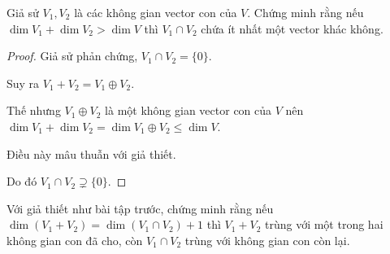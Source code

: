 \documentclass[class=linearalgebra,crop=false]{standalone}
\begin{document}
\begin{exercise}Giả sử $V_{1}, V_{2}$ là các không gian vector con của $V$. Chứng minh rằng nếu $\dim V_{1} + \dim V_{2} > \dim V$ thì $V_{1}\cap V_{2}$ chứa ít nhất một vector khác không.
\end{exercise}

\begin{proof}Giả sử phản chứng, $V_{1}\cap V_{2} = \{ 0 \}$.
    \par Suy ra $V_{1} + V_{2} = V_{1}\oplus V_{2}$.
    \par Thế nhưng $V_{1}\oplus V_{2}$ là một không gian vector con của $V$ nên $\dim V_{1} + \dim V_{2} = \dim V_{1}\oplus V_{2} \le \dim V$.
    \par Điều này mâu thuẫn với giả thiết.
    \par Do đó $V_{1}\cap V_{2} \supsetneq \{ 0 \}$.
\end{proof}

\begin{exercise}Với giả thiết như bài tập trước, chứng minh rằng nếu $\dim(V_{1} + V_{2}) = \dim(V_{1}\cap V_{2}) + 1$ thì $V_{1} + V_{2}$ trùng với một trong hai không gian con đã cho, còn $V_{1}\cap V_{2}$ trùng với không gian con còn lại.
\end{exercise}
\end{document}
